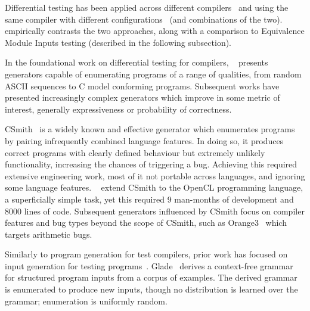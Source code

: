 Differential testing has been applied across different compilers~\cite{Chen2016b,Lidbury2015a} and using the same compiler with different configurations~\cite{Kyle2015b,Paka2011} (and combinations of the two). \citeauthor{Chen2014a}~\cite{Chen2014a} empirically contrasts the two approaches, along with a comparison to Equivalence Module Inputs testing (described in the following subsection).

In the foundational work on differential testing for compilers, \citeauthor{McKeeman1998}~\cite{McKeeman1998} presents generators capable of enumerating programs of a range of qualities, from random ASCII sequences to C model conforming programs. Subsequent works have presented increasingly complex generators which improve in some metric of interest, generally expressiveness or probability of correctness.

CSmith~\cite{Yang2011} is a widely known and effective generator which enumerates programs by pairing infrequently combined language features. In doing so, it produces correct programs with clearly defined behaviour but extremely unlikely functionality, increasing the chances of triggering a bug. Achieving this required extensive engineering work, most of it not portable across languages, and ignoring some language features.
\citeauthor{Lidbury2015a}~\cite{Lidbury2015a} extend CSmith to the OpenCL programming language, a superficially simple task, yet this required 9 man-months of development and 8000 lines of code.
Subsequent generators influenced by CSmith focus on compiler features and bug types beyond the scope of CSmith, such as Orange3~\cite{Nagai2013} which targets arithmetic bugs.

Similarly to program generation for test compilers, prior work has focused on input generation for testing programs~\cite{Godefroid2005,Claessen2014,Duregard2012,Fetscher2015a,Runciman2008}. Glade~\cite{Bastani2017} derives a context-free grammar for structured program inputs from a corpus of examples. The derived grammar is enumerated to produce new inputs, though no distribution is learned over the grammar; enumeration is uniformly random.


